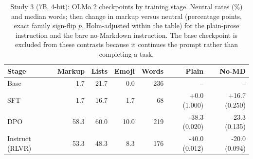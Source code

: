 \begin{table}[t]
\centering
\footnotesize
\caption{Study 3 (7B, 4-bit): OLMo 2 checkpoints by training stage. Neutral rates (\%) and median words; then change in markup versus neutral (percentage points, exact family sign-flip $p$, Holm-adjusted within the table) for the plain-prose instruction and the bare no-Markdown instruction. The base checkpoint is excluded from these contrasts because it continues the prompt rather than completing a task.}
\label{tab:v2-stages_7b}
\begin{tabular}{lrrrrrr}
\toprule
Stage & Markup & Lists & Emoji & Words & Plain & No-MD \\
\midrule
Base & 1.7 & 21.7 & 0.0 & 236 & -- & -- \\
SFT & 1.7 & 16.7 & 1.7 & 68 & +0.0 (1.000) & +16.7 (0.250) \\
DPO & 58.3 & 60.0 & 10.0 & 219 & -38.3 (0.020) & -23.3 (0.135) \\
Instruct (RLVR) & 53.3 & 48.3 & 8.3 & 176 & -40.0 (0.012) & -20.0 (0.094) \\
\bottomrule
\end{tabular}
\end{table}
